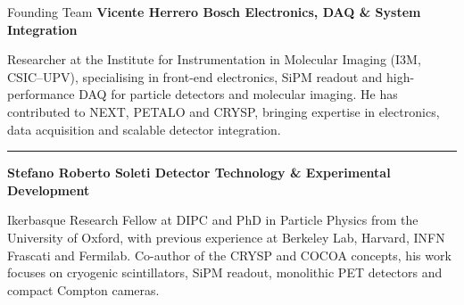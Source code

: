 \documentclass[aspectratio=169,11pt]{beamer}
\begin{document}
\begin{frame}{Founding Team}
{\scriptsize\bfseries\color{PTblue}
Vicente Herrero Bosch
\hfill
{\tiny\bfseries\color{black}
Electronics, DAQ \& System Integration}
}



{\tiny
Researcher at the Institute for Instrumentation in Molecular Imaging
(I3M, CSIC--UPV), specialising in front-end electronics, SiPM readout
and high-performance DAQ for particle detectors and molecular imaging.
He has contributed to NEXT, PETALO and CRYSP, bringing expertise in
electronics, data acquisition and scalable detector integration.
}


{\color{gray!35}\rule{\textwidth}{0.35pt}}



{\scriptsize\bfseries\color{PTblue}
Stefano Roberto Soleti
\hfill
{\tiny\bfseries\color{black}
Detector Technology \& Experimental Development}
}



{\tiny
Ikerbasque Research Fellow at DIPC and PhD in Particle Physics from
the University of Oxford, with previous experience at Berkeley Lab,
Harvard, INFN Frascati and Fermilab. Co-author of the CRYSP and COCOA
concepts, his work focuses on cryogenic scintillators, SiPM readout,
monolithic PET detectors and compact Compton cameras.
}

\vfill

\end{frame}
\end{document}
